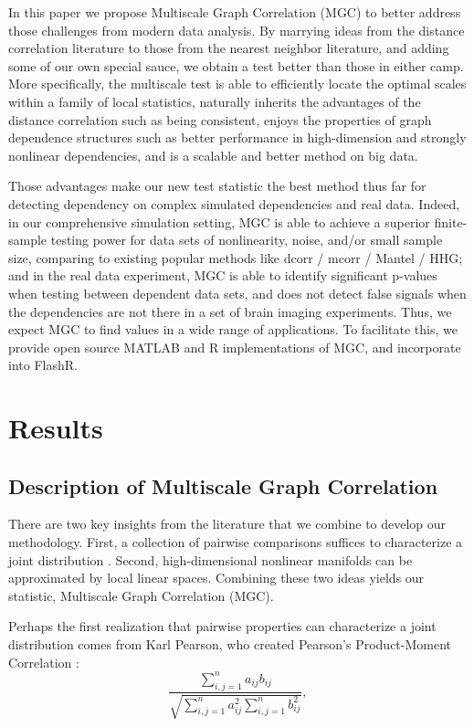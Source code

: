 \documentclass[11pt]{article}
\begin{document}
In this paper we propose Multiscale Graph Correlation (MGC) to better address those challenges from modern data analysis. By marrying ideas from the distance correlation literature to those from the nearest neighbor literature, and adding some of our own special sauce, we obtain a test better than those in either camp.  More specifically,  the multiscale test is able to efficiently locate the optimal scales within a family of local statistics, naturally inherits the advantages of the distance correlation such as being consistent, enjoys the properties of graph dependence structures such as better performance in high-dimension and strongly nonlinear dependencies, and is a scalable and better method on big data. 

Those advantages make our new test statistic the best method thus far for detecting dependency on complex simulated dependencies and real data. Indeed, in our comprehensive simulation setting, MGC is able to achieve a superior finite-sample testing power for data sets of nonlinearity, noise, and/or small sample size, comparing to existing popular methods like dcorr / mcorr / Mantel / HHG; and in the real data experiment, MGC is able to identify significant p-values when testing between dependent data sets,  and does not detect false signals when the dependencies are not there in a set of brain imaging experiments. Thus, we expect MGC to find values in a wide range of applications.  To facilitate this, we provide open source MATLAB and R implementations of MGC, and incorporate into FlashR.

\section{Results}
\label{main}
\subsection{Description of Multiscale Graph Correlation}
\label{main1}
There are two key insights from the literature that we combine to develop our methodology.  First, a collection of pairwise comparisons  suffices to characterize a joint distribution \cite{Maa1996}.  Second, high-dimensional nonlinear manifolds can be approximated by local linear spaces.  Combining these two ideas yields our statistic,  Multiscale Graph Correlation (MGC).  

Perhaps the first realization that pairwise properties can characterize a joint distribution comes from  Karl Pearson, who created Pearson's Product-Moment Correlation \cite{Pearson1895}:
\begin{equation}
\label{generalCoef}
\frac{\sum_{i,j=1}^n a_{ij} b_{ij}}{\sqrt{\sum_{i,j=1}^n  a_{ij}^{2} \sum_{i,j=1}^n b_{ij}^{2}}}, 
\end{equation}
\end{document}

